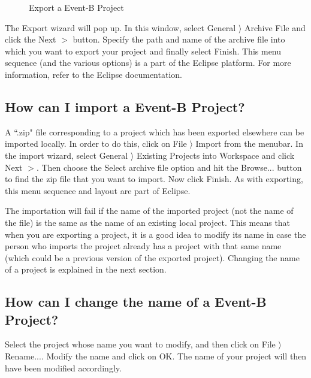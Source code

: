 \begin{figure}[!ht]
\begin{center}
	\caption{Export a Event-B Project}
	\label{fig_faq_exportproject}
\end{center}
\end{figure}

The \textsf{Export} wizard will pop up. In this window, select \textsf{General $\rangle$ Archive File} and click the \textsf{Next $>$} button. Specify the path and name of the archive file into which you want to export your project and finally select \textsf{Finish}. This menu sequence (and the various options) is a part of the Eclipse platform. For more information, refer to the Eclipse documentation. 

\subsection{How can I import a Event-B Project?}

A ``.zip" file corresponding to a project which has been exported elsewhere can be imported locally. In order to do this, click on \textsf{File $\rangle$ Import} from the menubar. In the import wizard, select \textsf{General $\rangle$ Existing Projects into Workspace} and click \textsf{Next $>$}. Then choose the \textsf{Select archive file} option and hit the \textsf{Browse...} button to find the zip file that you want to import. Now click \textsf{Finish}. As with exporting, this menu sequence and layout are part of Eclipse.

The importation will fail if the name of the imported project (not the name of the file) is the same as the name of an existing local project. This means that when you are exporting a project, it is a good idea to modify its name in case the person who imports the project already has a project with that same name (which could be a previous version of the exported project). Changing the name of a project is explained in the next section. 

\subsection{How can I change the name of a Event-B Project?}

Select the project whose name you want to modify, and then click on \textsf{File $\rangle$ Rename...}. Modify the name and click on \textsf{OK}. The name of your project will then have been modified accordingly. 

